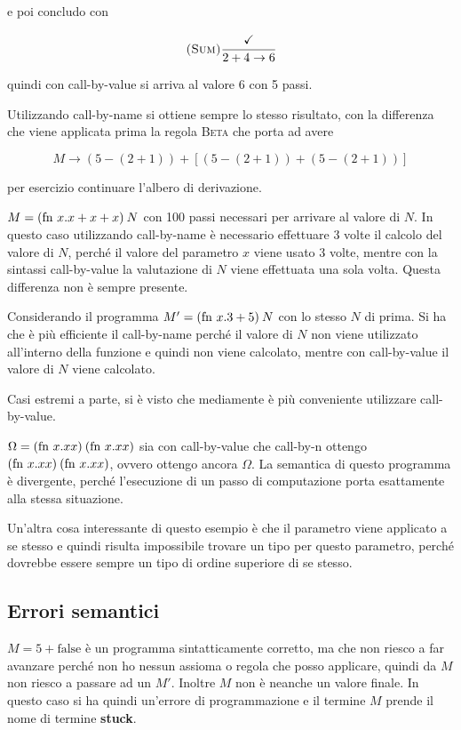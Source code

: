 e poi concludo con

$$
\textsc{(Sum)}
\cfrac{\checkmark}{2+4 \rightarrow 6}
$$

quindi con call-by-value si arriva al valore 6 con 5 passi.

Utilizzando call-by-name si ottiene sempre lo stesso risultato, con la differenza che viene applicata prima la regola \textsc{Beta} che porta ad avere

$$
M \rightarrow (5-(2+1)) + [(5-(2+1)) + (5-(2+1))]
$$

per esercizio continuare l'albero di derivazione. 

$M = (\text{fn } x.x+x+x)\: N $ con 100 passi necessari per arrivare al valore di $N$.
In questo caso utilizzando call-by-name è necessario effettuare 3 volte il calcolo del valore di $N$, perché il valore del parametro $x$ viene usato 3 volte, mentre con la sintassi call-by-value la valutazione di $N$ viene effettuata una sola volta. Questa differenza non è sempre presente.

Considerando il programma $M' = (\text{fn } x.3+5) \:N$ con lo stesso $N$ di prima. Si ha che è più efficiente il call-by-name perché il valore di $N$ non viene utilizzato all'interno della funzione e quindi non viene calcolato, mentre con call-by-value il valore di $N$ viene calcolato.

Casi estremi a parte, si è visto che mediamente è più conveniente utilizzare call-by-value.

$\Omega = (\text{fn } x.x x)\: (\text{fn } x. x x)$ sia con call-by-value che call-by-n ottengo $(\text{fn } x.x x)\: (\text{fn } x.x x)$, ovvero ottengo ancora $\Omega$.
La semantica di questo programma è divergente, perché l'esecuzione di un passo di computazione porta esattamente alla stessa situazione.

Un'altra cosa interessante di questo esempio è che il parametro viene applicato a se stesso e quindi risulta impossibile trovare un tipo per questo parametro, perché dovrebbe essere sempre un tipo di ordine superiore di se stesso.

\subsection{Errori semantici}
$M = 5 + \text{false}$ è un programma sintatticamente corretto, ma che non riesco a far avanzare perché non ho nessun assioma o regola che posso applicare, quindi da $M$ non riesco a passare ad un $M'$. Inoltre $M$ non è neanche un valore finale.
In questo caso si ha quindi un'errore di programmazione e il termine $M$ prende il nome di termine \textbf{stuck}.


